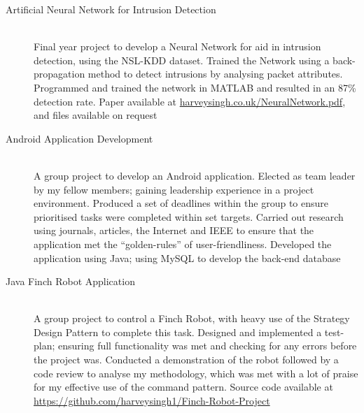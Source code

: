 \documentclass[a4paper,10pt]{extarticle} %
\begin{document}
{\begin{description}
\item[Artificial Neural Network for Intrusion Detection]\hfill \\
Final year project to develop a Neural Network for aid in intrusion detection, using the NSL-KDD dataset. Trained the Network using a back-propagation method to detect intrusions by analysing packet attributes. Programmed and trained the network in MATLAB and resulted in an 87\% detection rate. Paper available at \href{http://harveysingh.co.uk/NeuralNetwork.pdf}{harveysingh.co.uk/NeuralNetwork.pdf}, and files available on request

\item[Android Application Development]\hfill \\
A group project to develop an Android application. Elected as team leader by my fellow members; gaining leadership experience in a project environment. Produced a set of deadlines within the group to ensure prioritised tasks were completed within set targets. Carried out research using journals, articles, the Internet and IEEE to ensure that the application met the “golden-rules” of user-friendliness. Developed the application using Java; using MySQL to develop the back-end database

\item[Java Finch Robot Application]\hfill \\
A group project to control a Finch Robot, with heavy use of the Strategy Design Pattern to complete this task. Designed and implemented a test-plan; ensuring full functionality was met and checking for any errors before the project was. Conducted a demonstration of the robot followed by a code review to analyse my methodology, which was met with a lot of praise for my effective use of the command pattern. Source code available at \href{https://github.com/harveysingh1/Finch-Robot-Project}{https://github.com/harveysingh1/Finch-Robot-Project}



\end{description}}
\end{document}
